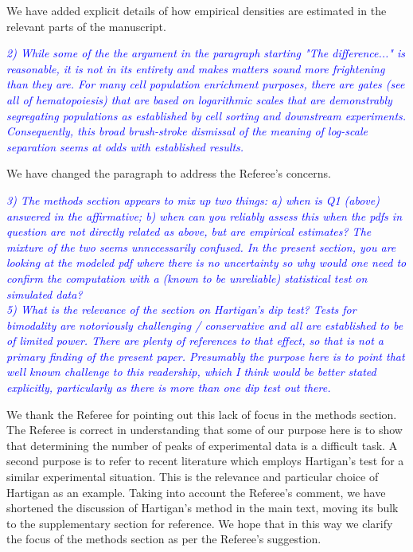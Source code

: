 \documentclass[letter,11pt,draft]{article}
\newcommand{\re}[1]{\emph{\textcolor{blue}{#1}}}
\begin{document}
\smallskip
We have added explicit details of how empirical densities are estimated in the relevant parts of the manuscript.

\re{
2) While some of the the argument in the paragraph starting "The difference..." is reasonable, it is not in its entirety and makes matters sound more frightening than they are. For many cell population enrichment purposes, there are gates (see all of hematopoiesis) that are based on logarithmic scales that are demonstrably segregating populations as established by cell sorting and downstream experiments.  Consequently, this broad brush-stroke dismissal of the meaning of log-scale separation seems at odds with established results.
}

\smallskip
We have changed the paragraph to address the Referee's concerns. 

\re{
3) The methods section appears to mix up two things: a) when is Q1 (above) answered in the affirmative; b) when can you reliably assess this when the pdfs in question are not directly related as above, but are empirical estimates? The mixture of the two seems unnecessarily confused. In the present section, you are looking at the modeled pdf where there is no uncertainty so why would one need to confirm the computation with a (known to be unreliable) statistical test on simulated data?
\\
5) What is the relevance of the section on Hartigan's dip test? Tests for bimodality are notoriously challenging / conservative and all are established to be of limited power. There are plenty of references to that effect, so that is not a primary finding of the present paper. Presumably the purpose here is to point that well known challenge to this readership, which I think would be better stated explicitly, particularly as there is more than one dip test out there.}

\smallskip
We thank the Referee for pointing out this lack of focus in the methods section. The Referee is correct in understanding that some of our purpose here is to show that determining the number of peaks of experimental data is a difficult task. A second purpose is to refer to recent literature which employs Hartigan's test for a similar experimental situation. This is the relevance and particular choice of Hartigan as an example. Taking into account the Referee's comment, we have shortened the discussion of Hartigan's method in the main text, moving its bulk to the supplementary section for reference. We hope that in this way we clarify the focus of the methods section as per the Referee's suggestion.
\end{document}
